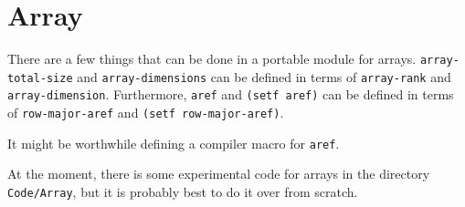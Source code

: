\chapter{Array}
\label{chap-array}

There are a few things that can be done in a portable module for
arrays.  \texttt{array-total-size} and \texttt{array-dimensions} can
be defined in terms of \texttt{array-rank} and
\texttt{array-dimension}.  Furthermore, \texttt{aref} and
\texttt{(setf aref)} can be defined in terms of
\texttt{row-major-aref} and \texttt{(setf row-major-aref)}. 

It might be worthwhile defining a compiler macro for \texttt{aref}. 

At the moment, there is some experimental code for arrays in the
directory \texttt{Code/Array}, but it is probably best to do it over
from scratch. 

